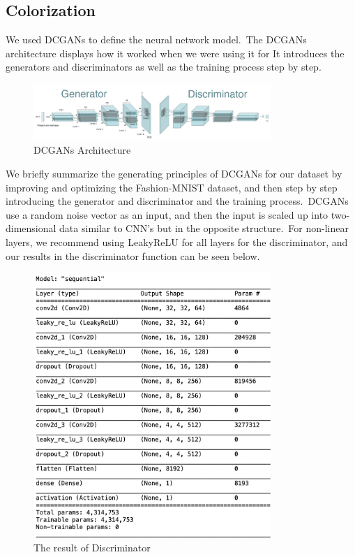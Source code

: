 \documentclass[conference]{IEEEtran}
\begin{document}
    \subsection{Colorization}\label{subsec:results-colorization}

    We used DCGANs to define the neural network model.\ The DCGANs architecture displays how it worked when we were using it for It introduces the generators and discriminators as well as the training process step by step.

    \begin{figure}
        \caption{DCGANs Architecture}
        \label{fig:dcgan-architecture}
        \includegraphics[width=9cm]{architecture.png}
        \centering
    \end{figure}

    We briefly summarize the generating principles of DCGANs for our dataset by improving and optimizing the Fashion-MNIST dataset, and then step by step introducing the generator and discriminator and the training process.\ DCGANs use a random noise vector as an input, and then the input is scaled up into two-dimensional data similar to CNN's but in the opposite structure.\ For non-linear layers, we recommend using LeakyReLU for all layers for the discriminator, and our results in the discriminator function can be seen below.

    \begin{figure}
        \caption{The result of Discriminator}
        \label{fig:discriminator}
        \includegraphics[width=9cm]{discriminator.png}
        \centering
    \end{figure}
\end{document}
